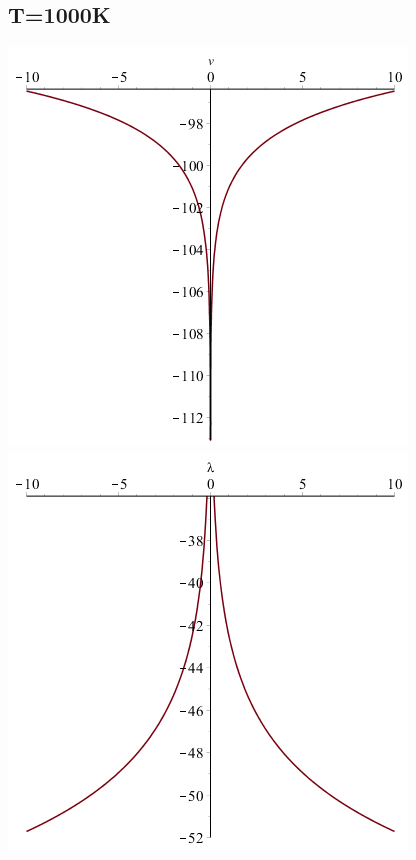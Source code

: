 \documentclass[11pt]{article} %
\begin{document}
\begin{enumerate}[i.)]
\subsection*{T=1000K}
\includegraphics[scale=.5]{plots/problem10plot1000alog.png}
\includegraphics[scale=.5]{plots/problem10plot1000blog.png} \\


\end{enumerate}
\end{document}
